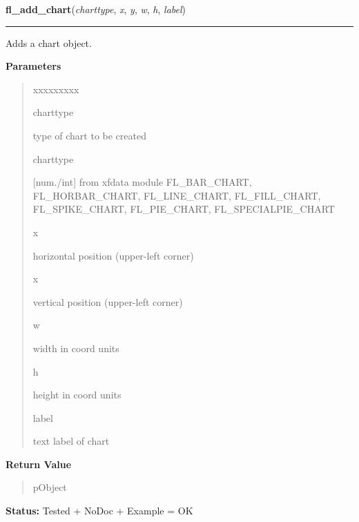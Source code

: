 \hspace{.8\funcindent}\begin{boxedminipage}{\funcwidth}

    \raggedright \textbf{fl\_add\_chart}(\textit{charttype}, \textit{x}, \textit{y}, \textit{w}, \textit{h}, \textit{label})

    \vspace{-1.5ex}

    \rule{\textwidth}{0.5\fboxrule}
\setlength{\parskip}{2ex}
    Adds a chart object.

\setlength{\parskip}{1ex}
      \textbf{Parameters}
      \vspace{-1ex}

      \begin{quote}
        \begin{Ventry}{xxxxxxxxx}

          \item[charttype]

          type of chart to be created

          \item[charttype]

          [num./int] from xfdata module FL\_BAR\_CHART, FL\_HORBAR\_CHART, 
          FL\_LINE\_CHART, FL\_FILL\_CHART, FL\_SPIKE\_CHART, 
          FL\_PIE\_CHART, FL\_SPECIALPIE\_CHART

          \item[x]

          horizontal position (upper-left corner)

          \item[x]

          vertical position (upper-left corner)

          \item[w]

          width in coord units

          \item[h]

          height in coord units

          \item[label]

          text label of chart

        \end{Ventry}

      \end{quote}

      \textbf{Return Value}
    \vspace{-1ex}

      \begin{quote}
      pObject

      \end{quote}

\textbf{Status:} Tested + NoDoc + Example = OK



    \end{boxedminipage}

